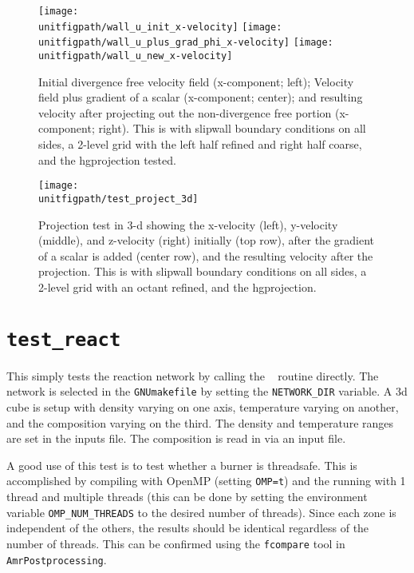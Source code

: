 \begin{figure}[t] 
\centering
\texttt{[image: \\unitfigpath/wall\_u\_init\_x-velocity]} 
\texttt{[image: \\unitfigpath/wall\_u\_plus\_grad\_phi\_x-velocity]} 
\texttt{[image: \\unitfigpath/wall\_u\_new\_x-velocity]} 
%
\caption[Results of the 2-d {\tt test\_projection} unit test]{\label{fig:unit:projtest}
  Initial divergence free velocity field (x-component; left); Velocity
  field plus gradient of a scalar (x-component; center); and resulting
  velocity after projecting out the non-divergence free portion
  (x-component; right).  This is with slipwall boundary conditions on
  all sides, a 2-level grid with the left half refined and right half
  coarse, and the hgprojection tested.}
\end{figure}


\begin{figure}
\centering
\texttt{[image: \\unitfigpath/test\_project\_3d]}
%
\caption[Results of the 3-d {\tt test\_projection} unit test]{\label{fig:unit:projtest3d}
  Projection test in 3-d showing the x-velocity (left), y-velocity
  (middle), and z-velocity (right) initially (top row), after the
  gradient of a scalar is added (center row), and the resulting
  velocity after the projection.  This is with slipwall boundary conditions
  on all sides, a 2-level grid with an octant refined, and the hgprojection.}
\end{figure}

\section{\tt test\_react}

  This simply tests the reaction network by calling
  the \maestro\  routine directly.  The network is
  selected in the {\tt GNUmakefile} by setting the {\tt NETWORK\_DIR}
  variable.  A 3d cube is setup with density varying on one axis,
  temperature varying on another, and the composition varying on the
  third.  The density and temperature ranges are set in the inputs
  file.  The composition is read in via an input file.

  A good use of this test is to test whether a burner is threadsafe.
  This is accomplished by compiling with OpenMP (setting {\tt OMP=t})
  and the running with 1 thread and multiple threads (this can be done
  by setting the environment variable {\tt OMP\_NUM\_THREADS} to the 
  desired number of threads).  Since each zone is independent of the
  others, the results should be identical regardless of the number
  of threads.  This can be confirmed using the {\tt fcompare} tool
  in {\tt AmrPostprocessing}.


